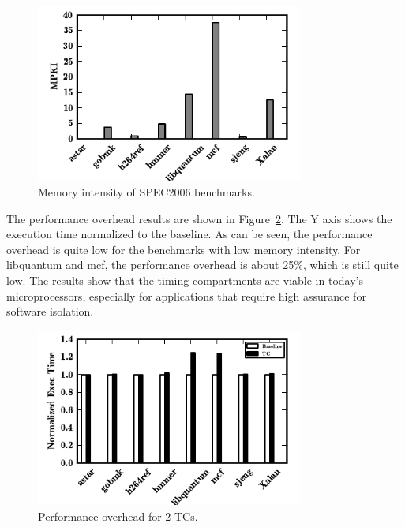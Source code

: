 \begin{figure}
    \begin{center}
        \includegraphics[width=3.46in]{figs/memstudy.pdf}
        \caption{Memory intensity of SPEC2006 benchmarks.}
        \label{fig:memstudy}
    \end{center}
\end{figure}

The performance overhead results are shown in Figure~\ref{fig:performance}. The Y axis shows the 
execution time normalized to the baseline. As can be seen, the performance overhead is quite low
for the benchmarks with low memory intensity. For libquantum and mcf, the performance overhead is about 
25\%, which is still quite low.
The results show that the timing compartments are viable in today's microprocessors,
especially for applications that require high assurance for software isolation.

\begin{figure}
    \begin{center}
        \includegraphics[width=3.46in]{figs/performance.pdf}
        \caption{Performance overhead for 2 TCs.}
        \label{fig:performance}
    \end{center}
\end{figure}

